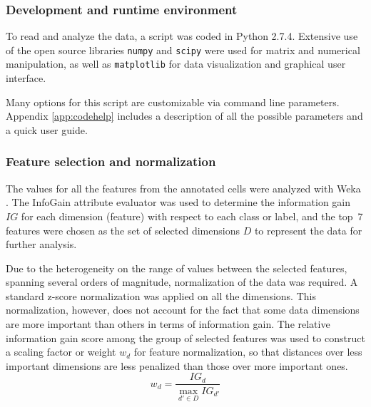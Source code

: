 \documentclass[oneside, a4paper, draft]{memoir} %
\begin{document}

\subsubsection{Development and runtime environment}
To read and analyze the data, a script was coded in Python 2.7.4. Extensive use of the open source libraries
\texttt{numpy} and \texttt{scipy} were used for matrix and numerical manipulation, as well as \texttt{matplotlib} for
data visualization and graphical user interface.

Many options for this script are customizable via command line parameters. Appendix \ref{app:codehelp} includes a
description of all the possible parameters and a quick user guide.

\subsubsection{Feature selection and normalization}
The values for all the features from the annotated cells were analyzed with Weka \cite{hall2009weka}. The InfoGain
attribute evaluator was used to determine the information gain $IG$ for each dimension (feature) with respect to
each class or label, and the top~7 features were chosen as the set of selected dimensions $D$ to
represent the data for further analysis.

Due to the heterogeneity on the range of values between the selected features, spanning 
several orders of magnitude, normalization of the data was required. A standard z-score normalization was applied on
all the dimensions. This normalization, however, does not account for the fact that some data dimensions are more
important than others in terms of information gain. The relative information gain score among the group of
selected features was used to construct a scaling factor or weight $w_d$ for feature normalization, so that
distances over less important dimensions are less penalized than those over more important ones.
\begin{equation}
	w_d = \frac{IG_d}{\max_{d' \in D} IG_{d'}}
\end{equation}
\end{document}
